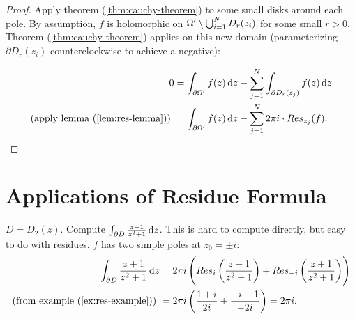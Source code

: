 \begin{proof}
Apply theorem (\ref{thm:cauchy-theorem}) to some small disks around each pole. By assumption, $f$ is holomorphic on $\Omega ' \setminus \bigcup_{i=1}^N D_r(z_i)$ for some small $r>0$. Theorem (\ref{thm:cauchy-theorem}) applies on this new domain (parameterizing $\partial D_r(z_i)$ counterclockwise to achieve a negative):

\begin{align*}
    0 &= \int_{\partial \om '} f(z) \dif z - \sum_{j=1}^N \int_{\partial D_r(z_j)} f(z) \dif z\\
    \text{(apply lemma (\ref{lem:res-lemma})) } &= \int_{\partial \om '} f(z) \dif z - \sum_{j=1}^N 2\pi i \cdot Res_{z_j} (f).
\end{align*}

\end{proof}


\section{Applications of Residue Formula}

\begin{example}
$D = D_2(z)$. Compute $\int_{\partial D} \frac{z+1}{z^2 + 1 } \dif z$. This is hard to compute directly, but easy to do with residues. $f$ has two simple poles at $z_0 = \pm i$:
\begin{align*}
    \int_{\partial D} \frac{z+1}{z^2 + 1 } \dif z &= 2\pi i \left( Res_{i} \left( \frac{z+1}{z^2 + 1 } \right) + Res_{-i} \left( \frac{z+1}{z^2 + 1 } \right) \right)\\ \text{(from example (\ref{ex:res-example})) } &= 2\pi i \left( \frac{1+i}{2i} + \frac{-i+1}{-2i} \right) = 2 \pi i.
\end{align*}

\end{example}


